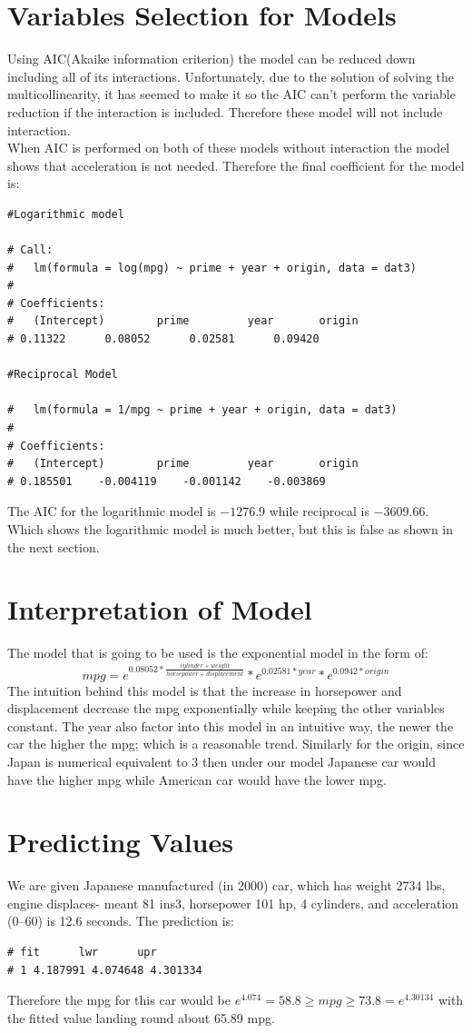 \documentclass[11pt]{article} %
\begin{document}
\section{Variables Selection for Models}
Using AIC(Akaike information criterion) the model can be reduced down including all of its interactions. Unfortunately, due to the solution of solving the multicollinearity, it has seemed to make it so the AIC can't perform the variable reduction if the interaction is included. Therefore these model will not include interaction.\\
When AIC is performed on both of these models without interaction the model shows that acceleration is not needed. Therefore the final coefficient for the model is:
\begin{lstlisting}
#Logarithmic model

# Call:
#   lm(formula = log(mpg) ~ prime + year + origin, data = dat3)
# 
# Coefficients:
#   (Intercept)        prime         year       origin  
# 0.11322      0.08052      0.02581      0.09420  

#Reciprocal Model

#   lm(formula = 1/mpg ~ prime + year + origin, data = dat3)
# 
# Coefficients:
#   (Intercept)        prime         year       origin  
# 0.185501    -0.004119    -0.001142    -0.003869  
\end{lstlisting}
The AIC for the logarithmic model is $-1276.9$ while reciprocal is $-3609.66$. Which shows the logarithmic model is much better, but this is false as shown in the next section.


\section{Interpretation of Model}
The model that is going to be used is the exponential model in the form of:
$$
mpg = e^{0.08052*\frac{cylinder+weight}{horsepower + displacement}}*e^{0.02581*year}*e^{0.0942*origin}
$$
The intuition behind this model is that the increase in horsepower and displacement decrease the mpg exponentially while keeping the other variables constant. The year also factor into this model in an intuitive way, the newer the car the higher the mpg; which is a reasonable trend. Similarly for the origin, since Japan is numerical equivalent to 3 then under our model Japanese car would have the higher mpg while American car would have the lower mpg.
\section{Predicting Values}
We are given Japanese manufactured (in 2000) car, which has weight 2734 lbs, engine displaces- meant 81 ins3, horsepower 101 hp, 4 cylinders, and acceleration (0–60) is 12.6 seconds. The prediction is:
\begin{lstlisting}
# fit      lwr      upr
# 1 4.187991 4.074648 4.301334
\end{lstlisting}
Therefore the mpg for this car would be $e^{4.074}=58.8\geq mpg\geq 73.8 = e^{4.30134}$ with the fitted value landing round about 65.89 mpg.
\end{document}
